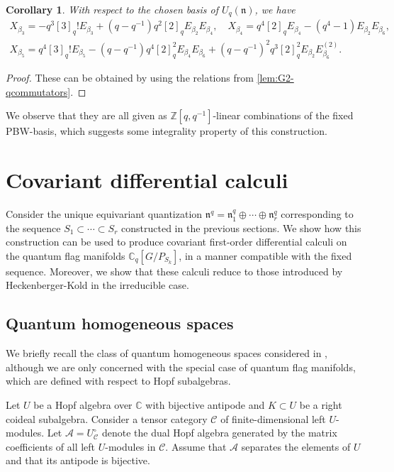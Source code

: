 \documentclass[a4paper, 12pt, reqno, english]{amsart}
\numberwithin{equation}{section}
\numberwithin{figure}{section}
\theoremstyle{plain}
\theoremstyle{plain}
\theoremstyle{plain}
\theoremstyle{plain}
\theoremstyle{plain}
\newtheorem{corollary}[theorem]{Corollary}
\theoremstyle{definition}
\theoremstyle{definition}
\theoremstyle{definition}
\theoremstyle{remark}
\theoremstyle{definition}
\theoremstyle{definition}
\newcommand{\Uqn}{U_q(\mathfrak{n})}
\newcommand{\bbC}{\mathbb{C}}
\newcommand{\bbZ}{\mathbb{Z}}
\newcommand{\lien}{\mathfrak{n}}
\newcommand{\calA}{\mathcal{A}}
\newcommand{\calC}{\mathcal{C}}
\newcommand{\qnil}{\lien^q}
\newcommand{\Cq}{\mathbb{C}_q}
\begin{document}
\begin{corollary}
With respect to the chosen basis of $\Uqn$, we have
\[
\begin{gathered}
X_{\beta_3} = - q^3 [3]_q! E_{\beta_3} + (q - q^{-1}) q^2 [2]_q E_{\beta_2} E_{\beta_4}, \quad
X_{\beta_4} = q^4 [2]_q E_{\beta_4} - (q^4 - 1) E_{\beta_2} E_{\beta_6}, \\
X_{\beta_5} = q^4 [3]_q! E_{\beta_5} - (q - q^{-1}) q^4 [2]_q^2 E_{\beta_4} E_{\beta_6} + (q - q^{-1})^2 q^3 [2]_q^2 E_{\beta_2} E_{\beta_6}^{(2)}.
\end{gathered}
\]
\end{corollary}

\begin{proof}
These can be obtained by using the relations from \cref{lem:G2-qcommutators}.
\end{proof}

We observe that they are all given as $\bbZ[q, q^{-1}]$-linear combinations of the fixed PBW-basis, which suggests some integrality property of this construction.

\section{Covariant differential calculi}
\label{sec:covariant-calculi}

Consider the unique equivariant quantization $\qnil = \qnil_1 \oplus \cdots \oplus \qnil_r$ corresponding to the sequence $S_1 \subset \cdots \subset S_r$ constructed in the previous sections.
We show how this construction can be used to produce covariant first-order differential calculi on the quantum flag manifolds $\Cq[G / P_{S_k}]$, in a manner compatible with the fixed sequence.
Moreover, we show that these calculi reduce to those introduced by Heckenberger-Kold in the irreducible case.

\subsection{Quantum homogeneous spaces}

We briefly recall the class of quantum homogeneous spaces considered in \cite{heko-homogeneous}, although we are only concerned with the special case of quantum flag manifolds, which are defined with respect to Hopf subalgebras.

Let $U$ be a Hopf algebra over $\bbC$ with bijective antipode and $K \subset U$ be a right coideal subalgebra.
Consider a tensor category $\calC$ of finite-dimensional left $U$-modules.
Let $\calA = U^\circ_\calC$ denote the dual Hopf algebra generated by the matrix coefficients of all left $U$-modules in $\calC$. Assume that $\calA$ separates the elements of $U$ and that its antipode is bijective.
\end{document}

